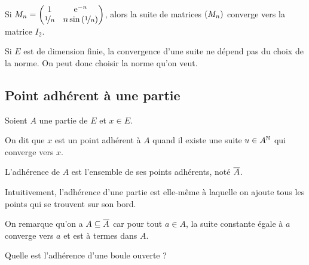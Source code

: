 \begin{ex}~\\
Si \(M_n=\begin{pmatrix}
1 & \mathrm{e}^{-n} \\
\nicefrac{1}{n} & n\sin\left(\nicefrac{1}{n}\right)
\end{pmatrix}\), alors la suite de matrices \(\left(M_n\right)\) converge vers la matrice \(I_2\).
\end{ex}

\begin{cor}
Si \(E\) est de dimension finie, la convergence d'une suite ne dépend pas du choix de la norme. On peut donc choisir la norme qu'on veut.
\end{cor}

\subsection{Point adhérent à une partie}

\begin{defi}
Soient \(A\) une partie de \(E\) et \(x\in E\).

On dit que \(x\) est un point adhérent à \(A\) quand il existe une suite \(u\in A^{\mathbb{N}}\) qui converge vers \(x\).

L'adhérence de \(A\) est l'ensemble de ses points adhérents, noté \(\overline{A}\).
\end{defi}

Intuitivement, l'adhérence d'une partie est elle-même à laquelle on ajoute tous les points qui se trouvent sur son bord.

\begin{rem}
On remarque qu'on a \(A\subseteq\overline{A}\) car pour tout \(a\in A\), la suite constante égale à \(a\) converge vers \(a\) et est à termes dans \(A\).
\end{rem}

\begin{exo}
Quelle est l'adhérence d'une boule ouverte ?
\end{exo}

